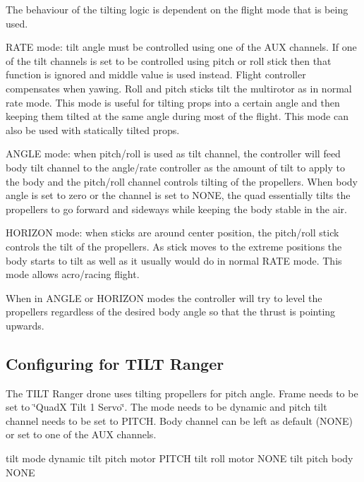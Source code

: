 The behaviour of the tilting logic is dependent on the flight mode that is being used.


\begin{DoxyItemize}
\item R\+A\+T\+E mode\+: tilt angle must be controlled using one of the A\+U\+X channels. If one of the tilt channels is set to be controlled using pitch or roll stick then that function is ignored and middle value is used instead. Flight controller compensates when yawing. Roll and pitch sticks tilt the multirotor as in normal rate mode. This mode is useful for tilting props into a certain angle and then keeping them tilted at the same angle during most of the flight. This mode can also be used with statically tilted props.
\item A\+N\+G\+L\+E mode\+: when pitch/roll is used as tilt channel, the controller will feed body tilt channel to the angle/rate controller as the amount of tilt to apply to the body and the pitch/roll channel controls tilting of the propellers. When body angle is set to zero or the channel is set to N\+O\+N\+E, the quad essentially tilts the propellers to go forward and sideways while keeping the body stable in the air.
\item H\+O\+R\+I\+Z\+O\+N mode\+: when sticks are around center position, the pitch/roll stick controls the tilt of the propellers. As stick moves to the extreme positions the body starts to tilt as well as it usually would do in normal R\+A\+T\+E mode. This mode allows acro/racing flight.
\end{DoxyItemize}

When in A\+N\+G\+L\+E or H\+O\+R\+I\+Z\+O\+N modes the controller will try to level the propellers regardless of the desired body angle so that the thrust is pointing upwards.

\subsection*{Configuring for T\+I\+L\+T Ranger }

The T\+I\+L\+T Ranger drone uses tilting propellers for pitch angle. Frame needs to be set to \char`\"{}\+Quad\+X Tilt 1 Servo\char`\"{}. The mode needs to be dynamic and pitch tilt channel needs to be set to P\+I\+T\+C\+H. Body channel can be left as default (N\+O\+N\+E) or set to one of the A\+U\+X channels. \begin{DoxyVerb}tilt mode dynamic
tilt pitch motor PITCH
tilt roll motor NONE
tilt pitch body NONE\end{DoxyVerb}
 